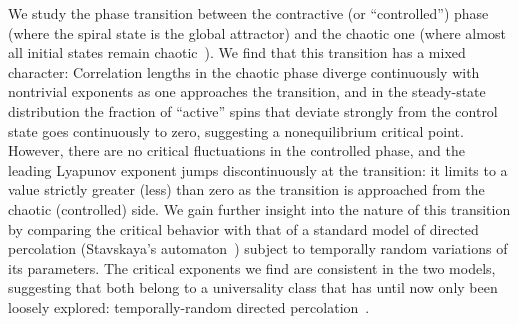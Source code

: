 \documentclass[twocolumn,amsmath,amssymb,floatfix,superscriptaddress,aps,prl]{revtex4-2}
\begin{document}
We study the phase transition between the  contractive (or ``controlled'') phase (where the spiral state is the global attractor) and the chaotic one (where almost all initial states remain chaotic~\cite{WijnLargestLyapExpClassicalSpin, DasDrivenHeisenberg}). We find that this transition has a mixed character: Correlation lengths in the chaotic phase diverge continuously with nontrivial exponents as one approaches the transition, and %
in the steady-state distribution the fraction of ``active'' spins that deviate strongly from the control state %
goes continuously to zero, suggesting a nonequilibrium critical point.  However, there are no critical fluctuations in the controlled phase, and the leading Lyapunov exponent jumps discontinuously at the transition: it limits to a value strictly greater (less) than zero as the transition is approached from the chaotic (controlled) side. We gain further insight into the nature of this transition by comparing the critical behavior with that of a standard model of directed percolation (Stavskaya's automaton~\cite{stavskaya1968homogeneous,shnirman1968ergodicity,toom1968family}) subject to temporally random variations of its parameters. The critical exponents we find are consistent in the two models, suggesting that both belong to a universality class that has until now only been loosely explored: temporally-random directed percolation~\cite{IwanDPtemprand}.
\end{document}
